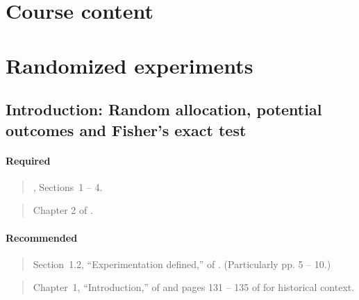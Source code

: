 \documentclass[12pt]{article}
\begin{document}
\newpage
\section*{Course content}

\section{Randomized experiments}

\subsection{Introduction: Random allocation, potential outcomes and Fisher's exact test}

\paragraph*{Required}

\begin{verse} , Sections~1 -- 4. \end{verse}

\begin{verse} Chapter 2 of . \end{verse}

\paragraph*{Recommended}

\begin{verse} Section~1.2, ``Experimentation defined,'' of . (Particularly pp. 5 -- 10.) \end{verse}

\begin{verse} Chapter~1, ``Introduction,'' of  and pages 131 -- 135 of  for historical context. \end{verse}
\end{document}
